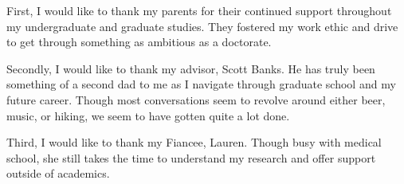 First, I would like to thank my parents for their continued support throughout my undergraduate and graduate studies. They fostered my work ethic and drive to get through something as ambitious as a doctorate.

Secondly, I would like to thank my advisor, Scott Banks. He has truly been something of a second dad to me as I navigate through graduate school and my future career. Though most conversations seem to revolve around either beer, music, or hiking, we seem to have gotten quite a lot done.

Third, I would like to thank my Fiancee, Lauren. Though busy with medical school, she still takes the time to understand my research and offer support outside of academics.